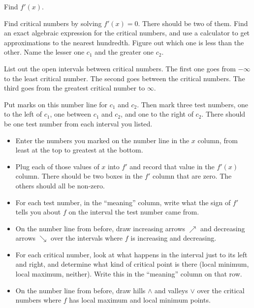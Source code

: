 \begin{ProblemSet}

 \begin{Problem}
  Find $f'(x)$.
 \end{Problem}

 \begin{Problem}[pencil space=3in]
  Find critical numbers by solving $f'(x) = 0$.
  There should be two of them.
  Find an exact algebraic expression for the critical numbers, and use a calculator to get approximations to the nearest hundredth.
  Figure out which one is less than the other.
  Name the lesser one $c_1$ and the greater one $c_2$.
 \end{Problem}

 \begin{Problem}
  List out the open intervals between critical numbers.
  The first one goes from $-\infty$ to the least critical number.
  The second goes between the critical numbers.
  The third goes from the greatest critical number to $\infty$.
 \end{Problem}

 \newpage

 \begin{Problem}[pencil space=0in]
  Put marks on this number line for $c_1$ and $c_2$.
  Then mark three test numbers, one to the left of $c_1$,
  one between $c_1$ and $c_2$,
  and one to the right of $c_2$.
  There should be one test number from each interval you listed.

  \NumberLine
 \end{Problem}

 \begin{Problem}[pencil space=0in]
  \begin{itemize}
  \item Enter the numbers you marked on the number line in the $x$ column, from least at the top to greatest at the bottom.
  \item Plug each of those values of $x$ into $f'$ and record that value in the $f'(x)$ column.
   There should be two boxes in the $f'$ column that are zero.
   The others should all be non-zero.
  \item For each test number, in the ``meaning'' column, write what the sign of $f'$ tells you about $f$ on the interval the test number came from.
  \item On the number line from before, draw increasing arrows $\nearrow$ and decreasing arrows $\searrow$ over the intervals where $f$ is increasing and decreasing.
  \item For each critical number, look at what happens in the interval just to its left and right, and determine what kind of critical point is there (local minimum, local maximum, neither).
   Write this in the ``meaning'' column on that row.
  \item On the number line from before, draw hills $\wedge$ and valleys $\vee$ over the critical numbers where $f$ has local maximum and local minimum points.
  \end{itemize}
  \bigskip


\end{Problem}
\end{ProblemSet}
